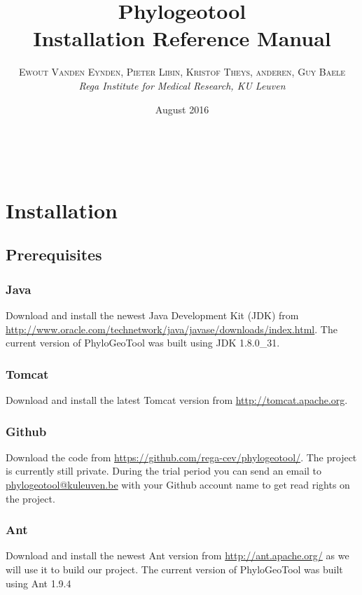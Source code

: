 \documentclass[a4paper, 11pt]{article} %
\title{\textbf{Phylogeotool}\\ %
Installation Reference Manual} %
\author{\textsc{Ewout Vanden Eynden, Pieter Libin, Kristof Theys, anderen, Guy Baele} %
\\{\textit{Rega Institute for Medical Research, KU Leuven}}} %
\date{August 2016} %
\makeatletter
\renewcommand{\maketitle}{ %
\begin{flushright} %
{\LARGE\@title} %

\vspace{50pt} %

{\large\@author} %
\\\@date %

\vspace{40pt} %
\end{flushright}
}
\makeatother
\begin{document}
\maketitle %

\vspace{30pt} %

\tableofcontents
\newpage

\section{Installation}

\subsection{Prerequisites}

\subsubsection*{Java}
Download and install the newest Java Development Kit (JDK) from \url{http://www.oracle.com/technetwork/java/javase/downloads/index.html}.
The current version of PhyloGeoTool was built using JDK 1.8.0\_31.

\subsubsection*{Tomcat}
Download and install the latest Tomcat version from \url{http://tomcat.apache.org}.

\subsubsection*{Github}
Download the code from \url{https://github.com/rega-cev/phylogeotool/}. 
The project is currently still private. 
During the trial period you can send an email to \href{mailto:phylogeotool@kuleuven.be}  {phylogeotool@kuleuven.be} with your Github account name to get read rights on the project.

\subsubsection*{Ant}
Download and install the newest Ant version from \url{http://ant.apache.org/} as we will use it to build our project.
The current version of PhyloGeoTool was built using Ant 1.9.4
\end{document}
